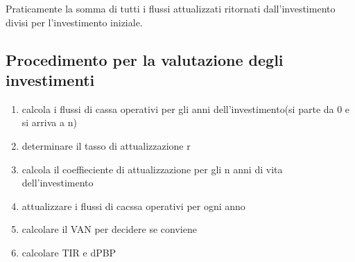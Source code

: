 Praticamente la somma di tutti i flussi attualizzati ritornati dall'investimento divisi per l'investimento iniziale.

\subsection{Procedimento per la valutazione degli
investimenti}

\begin{enumerate}
    \item calcola i flussi di cassa operativi per gli anni dell'investimento(si parte da 0 e si arriva a n)
    \item determinare il tasso di attualizzazione r
    \item calcola il coeffieciente di attualizzazione per gli n anni di vita dell'investimento
    \item attualizzare i flussi di cacssa operativi per ogni anno
    \item calcolare il VAN per decidere se conviene
    \item calcolare TIR e dPBP
\end{enumerate}
